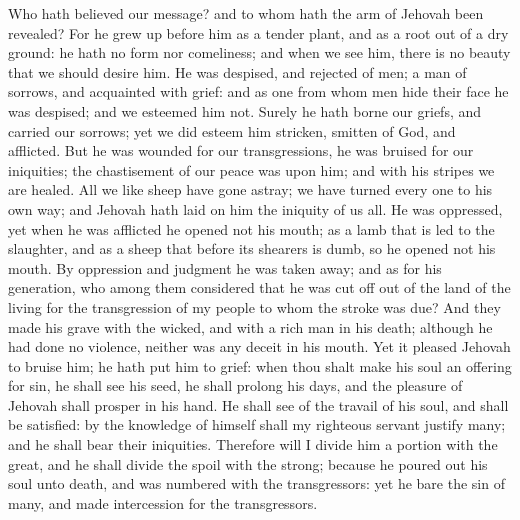 Who hath believed our message? and to whom hath the arm of Jehovah been revealed? For he grew up before him as a tender plant, and as a root out of a dry ground: he hath no form nor comeliness; and when we see him, there is no beauty that we should desire him. He was despised, and rejected of men; a man of sorrows, and acquainted with grief: and as one from whom men hide their face he was despised; and we esteemed him not.  Surely he hath borne our griefs, and carried our sorrows; yet we did esteem him stricken, smitten of God, and afflicted. But he was wounded for our transgressions, he was bruised for our iniquities; the chastisement of our peace was upon him; and with his stripes we are healed. All we like sheep have gone astray; we have turned every one to his own way; and Jehovah hath laid on him the iniquity of us all.  He was oppressed, yet when he was afflicted he opened not his mouth; as a lamb that is led to the slaughter, and as a sheep that before its shearers is dumb, so he opened not his mouth. By oppression and judgment he was taken away; and as for his generation, who among them considered that he was cut off out of the land of the living for the transgression of my people to whom the stroke was due? And they made his grave with the wicked, and with a rich man in his death; although he had done no violence, neither was any deceit in his mouth.  Yet it pleased Jehovah to bruise him; he hath put him to grief: when thou shalt make his soul an offering for sin, he shall see his seed, he shall prolong his days, and the pleasure of Jehovah shall prosper in his hand. He shall see of the travail of his soul, and shall be satisfied: by the knowledge of himself shall my righteous servant justify many; and he shall bear their iniquities. Therefore will I divide him a portion with the great, and he shall divide the spoil with the strong; because he poured out his soul unto death, and was numbered with the transgressors: yet he bare the sin of many, and made intercession for the transgressors. 

